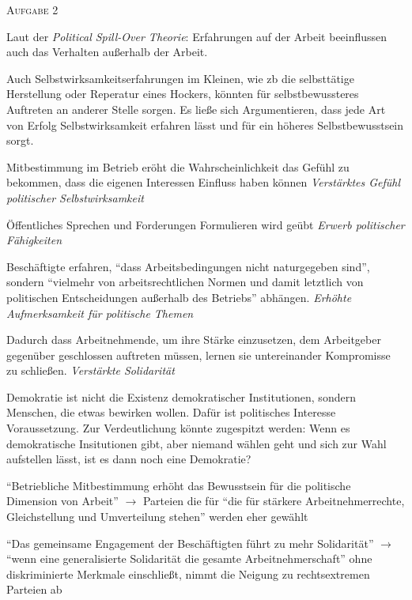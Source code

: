 \textsc{Aufgabe 2} \quad
\begin{myenumerate}
    \item Laut der \emph{Political Spill-Over Theorie}: Erfahrungen auf der Arbeit beeinflussen auch das Verhalten außerhalb der Arbeit. 
    \item Auch Selbstwirksamkeitserfahrungen im Kleinen, wie \gls{zb} die selbsttätige Herstellung oder Reperatur eines Hockers, könnten für selbstbewussteres Auftreten an anderer Stelle sorgen. Es ließe sich Argumentieren, dass jede Art von Erfolg Selbstwirksamkeit erfahren lässt und für ein höheres Selbstbewusstsein sorgt. 
    \item 
    \begin{myitemize}
        \item Mitbestimmung im Betrieb eröht die Wahrscheinlichkeit das Gefühl zu bekommen, dass die eigenen Interessen Einfluss haben können \emph{Verstärktes Gefühl politischer Selbstwirksamkeit}
        \item Öffentliches Sprechen und Forderungen Formulieren wird geübt \emph{Erwerb politischer Fähigkeiten}
        \item Beschäftigte erfahren, \enquote{dass Arbeitsbedingungen nicht naturgegeben sind}, sondern \enquote{vielmehr von arbeitsrechtlichen Normen und damit letztlich von politischen Entscheidungen außerhalb des Betriebs} abhängen. \emph{Erhöhte Aufmerksamkeit für politische Themen}
        \item Dadurch dass Arbeitnehmende, um ihre Stärke einzusetzen, dem Arbeitgeber gegenüber geschlossen auftreten müssen, lernen sie untereinander Kompromisse zu schließen. \emph{Verstärkte Solidarität}
    \end{myitemize}
    \item Demokratie ist nicht die Existenz demokratischer Institutionen, sondern Menschen, die etwas bewirken wollen. Dafür ist politisches Interesse Voraussetzung. Zur Verdeutlichung könnte zugespitzt werden: Wenn es demokratische Insitutionen gibt, aber niemand wählen geht und sich zur Wahl aufstellen lässt, ist es dann noch eine Demokratie?
    \item \enquote{Betriebliche Mitbestimmung erhöht das Bewusstsein für die politische Dimension von Arbeit} $\rightarrow$  Parteien die für \enquote{die für stärkere Arbeitnehmerrechte, Gleichstellung und Umverteilung stehen} werden eher gewählt 
    
    \enquote{Das gemeinsame Engagement der Beschäftigten führt zu mehr Solidarität} $\rightarrow$ \enquote{wenn eine generalisierte Solidarität die gesamte Arbeitnehmerschaft} ohne diskriminierte Merkmale einschließt, nimmt die Neigung zu rechtsextremen Parteien ab 
\end{myenumerate}


